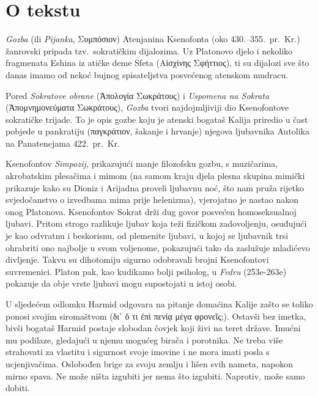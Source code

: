 


\section*{O tekstu}

\textit{Gozba} (ili \textit{Pijanka}, \textgreek[variant=ancient]{Συμπόσιον)} Atenjanina Ksenofonta (oko 430.–355.\ pr.~Kr.) žanrovski pripada tzv.\ sokratičkim dijalozima. Uz Platonovo djelo i nekoliko fragmenata Eshina iz atičke deme Sfeta \textgreek[variant=ancient]{(Αἰσχίνης Σφήττιος),} ti su dijalozi sve što danas imamo od nekoć bujnog spisateljstva posvećenog atenskom mudracu. 

Pored \textit{Sokratove obrane} \textgreek[variant=ancient]{(Ἀπολογία Σωκράτους)} i \textit{Uspomena na Sokrata} \textgreek[variant=ancient]{(Ἀπομνημονεύματα Σωκράτους),} \textit{Gozba} tvori najdojmljiviji dio Ksenofontove sokratičke trijade. To je opis gozbe koju je atenski bogataš Kalija priredio u čast pobjede u pankratiju \textgreek[variant=ancient]{(παγκράτιον,} šakanje i hrvanje) njegova ljubavnika Autolika na Panatenejama 422.\ pr.~Kr. 

Ksenofontov \textit{Simpozij,} prikazujući manje filozofsku gozbu, s muzičarima, akrobatskim plesačima i mimom (na samom kraju djela plesna skupina mimički prikazuje kako su Dioniz i Arijadna proveli ljubavnu noć, što nam pruža rijetko svjedočanstvo o izvedbama mima prije helenizma), vjerojatno je nastao nakon onog Platonova. Ksenofontov Sokrat drži dug govor posvećen homoseksualnoj ljubavi. Pritom strogo razlikuje ljubav koja teži fizičkom zadovoljenju, osuđujući je kao odvratnu i beskorisnu, od plemenite ljubavi, u kojoj se ljubavnik trsi ohrabriti ono najbolje u svom voljenome, pokazujući tako da zaslužuje mladićevo divljenje. Takvu su dihotomiju sigurno odobravali brojni Ksenofontovi suvremenici. Platon pak, kao kudikamo bolji psiholog, u \textit{Fedru} (253e-263e) pokazuje da obje vrste ljubavi mogu supostojati u istoj osobi. 

U sljedećem odlomku Harmid odgovara na pitanje domaćina Kalije zašto se toliko ponosi svojim siromaštvom \textgreek[variant=ancient]{(δι᾿ ὅ τι ἐπὶ πενίᾳ μέγα φρονεῖς;).} Ostavši bez imetka, bivši bogataš Harmid postaje slobodan čovjek koji živi na teret države. Imućni mu podilaze, gledajući u njemu mogućeg birača i porotnika. Ne treba više strahovati za vlastitu i sigurnost svoje imovine i ne mora imati posla s ucjenjivačima. Oslobođen brige za svoju zemlju i lišen svih nameta, napokon mirno spava. Ne može ništa izgubiti jer nema što izgubiti. Naprotiv, može samo dobiti.

